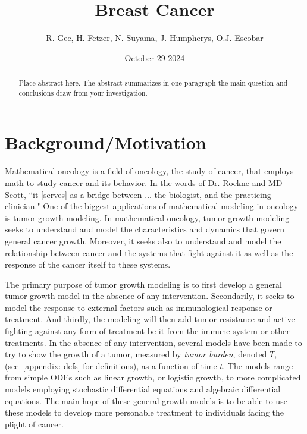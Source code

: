 \documentclass[11pt]{amsart}
\title{Breast Cancer}
\author{R. Gee, H. Fetzer, N. Suyama, J. Humpherys, O.J. Escobar}
\date{October 29 2024} %
\begin{document}
\maketitle %

\begin{abstract}
Place abstract here. The abstract summarizes in one paragraph the main question and conclusions draw from your investigation.
\end{abstract}

\section{Background/Motivation}

Mathematical oncology is a field of oncology, the study of cancer, that employs math to study cancer and its behavior.
In the words of Dr. Rockne and MD Scott, ``it [serves] as a bridge between $\ldots$ the biologist, and the practicing clinician." \cite{IntroMathOnc}
One of the biggest applications of mathematical modeling in oncology is tumor growth modeling.
In mathematical oncology, tumor growth modeling seeks to understand and model the characteristics and dynamics that govern general cancer growth.
Moreover, it seeks also to understand and model the relationship between cancer and the systems that fight against it as well as the response of the cancer itself to these systems.


The primary %
 purpose of tumor growth modeling is to first develop a general tumor growth model in the absence of any intervention.
Secondarily, it seeks to model the response to external factors such as immunological response or treatment. 
And thirdly, the modeling will then add tumor resistance and active fighting against any form of treatment be it from the immune system or other treatments.
In the absence of any intervention, several models have been made to try to show the growth of a tumor, measured by \textit{tumor burden}, denoted $T$, (see\ \ref{appendix: defs} for definitions), as a function of time $t$.
The models range from simple ODEs such as linear growth, or logistic growth, to more complicated models employing stochastic differential equations and algebraic differential equations. 
The main hope of these general growth models is to be able to use these models to develop more personable treatment to individuals facing the plight of cancer.\ \cite{YinMoes}
\end{document}
